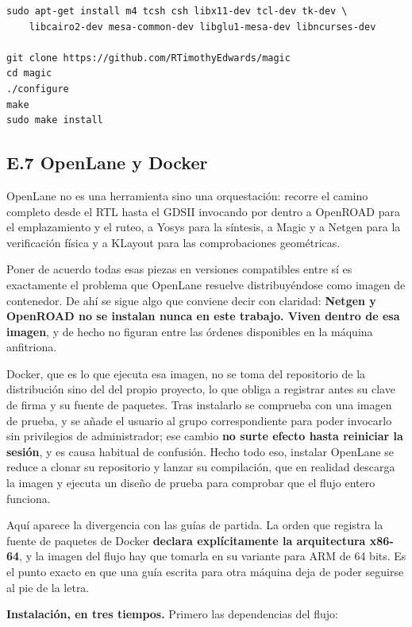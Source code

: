 \begin{verbatim}
sudo apt-get install m4 tcsh csh libx11-dev tcl-dev tk-dev \
    libcairo2-dev mesa-common-dev libglu1-mesa-dev libncurses-dev

git clone https://github.com/RTimothyEdwards/magic
cd magic
./configure
make
sudo make install
\end{verbatim}

\subsection{E.7 OpenLane y Docker}\label{e.7-openlane-y-docker}

OpenLane no es una herramienta sino una orquestación: recorre el camino
completo desde el RTL hasta el GDSII invocando por dentro a OpenROAD
para el emplazamiento y el ruteo, a Yosys para la síntesis, a Magic y a
Netgen para la verificación física y a KLayout para las comprobaciones
geométricas.

Poner de acuerdo todas esas piezas en versiones compatibles entre sí es
exactamente el problema que OpenLane resuelve distribuyéndose como
imagen de contenedor. De ahí se sigue algo que conviene decir con
claridad: \textbf{Netgen y OpenROAD no se instalan nunca en este
trabajo. Viven dentro de esa imagen}, y de hecho no figuran entre las
órdenes disponibles en la máquina anfitriona.

Docker, que es lo que ejecuta esa imagen, no se toma del repositorio de
la distribución sino del del propio proyecto, lo que obliga a registrar
antes su clave de firma y su fuente de paquetes. Tras instalarlo se
comprueba con una imagen de prueba, y se añade el usuario al grupo
correspondiente para poder invocarlo sin privilegios de administrador;
ese cambio \textbf{no surte efecto hasta reiniciar la sesión}, y es
causa habitual de confusión. Hecho todo eso, instalar OpenLane se reduce
a clonar su repositorio y lanzar su compilación, que en realidad
descarga la imagen y ejecuta un diseño de prueba para comprobar que el
flujo entero funciona.

Aquí aparece la divergencia con las guías de partida. La orden que
registra la fuente de paquetes de Docker \textbf{declara explícitamente
la arquitectura x86-64}, y la imagen del flujo hay que tomarla en su
variante para ARM de 64 bits. Es el punto exacto en que una guía escrita
para otra máquina deja de poder seguirse al pie de la letra.

\textbf{Instalación, en tres tiempos.} Primero las dependencias del
flujo:

